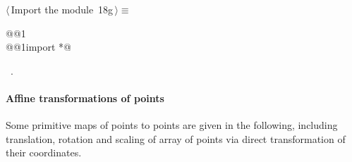 \documentclass[11pt,oneside]{article}	%
\begin{document}
\begin{flushleft} \small \label{scrap47}
\protect{}$\langle\,$Import the module\nobreak\ {\footnotesize 18g}$\,\rangle\equiv$
\vspace{-1ex}
\begin{list}{}{} \item
\mbox{}\verb@import @@1\verb@@\\
\mbox{}\verb@from @@1\verb@ import *@\\
\mbox{}\verb@@{\NWsep}
\end{list}
\vspace{-1ex}
\footnotesize\addtolength{\baselineskip}{-1ex}
\begin{list}{}{\setlength{\itemsep}{-\parsep}\setlength{\itemindent}{-\leftmargin}}
\item \NWtxtMacroRefIn\ .
\end{list}
\end{flushleft}

\paragraph{Affine transformations of points} Some primitive maps of points to points are given in the following, including translation, rotation and scaling of array of points via direct transformation of their coordinates.
\end{document}
